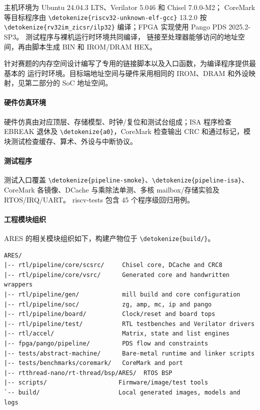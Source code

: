\documentclass[UTF8,a4paper,12pt,fontset=none,scheme=plain]{ctexart}
\newcommand{\code}[1]{\texttt{\detokenize{#1}}}
\renewcommand{\code}[1]{{\small\ttfamily\urlstyle{tt}\expandafter\nolinkurl\expandafter{\detokenize{#1}}}}
\begin{document}
主机环境为 Ubuntu 24.04.3 LTS、Verilator 5.046 和 Chisel 7.0.0-M2；
CoreMark 等目标程序由 \code{riscv32-unknown-elf-gcc} 13.2.0 按
\code{rv32im_zicsr/ilp32} 编译；FPGA 实现使用 Pango PDS 2025.2-SP3。
测试程序与裸机运行时环境共同编译，
链接至处理器能够访问的地址空间，再由脚本生成 BIN 和 IROM/DRAM HEX。

针对赛题的内存空间设计编写了专用的链接脚本以及入口函数，为编译程序提供最基本的
运行时环境。目标端地址空间与硬件采用相同的 IROM、DRAM 和外设映射，见第二部分的 SoC 地址空间。

\paragraph{硬件仿真环境}

硬件仿真由对应顶层、存储模型、时钟/复位和测试台组成；ISA 程序检查 EBREAK 退休及 \code{a0}，CoreMark 检查输出 CRC 和通过标记，模块测试检查缓存、算术、外设与中断协议。

\paragraph{测试程序}

测试入口覆盖 \code{pipeline-smoke}、\code{pipeline-isa}、CoreMark 各镜像、DCache 与乘除法单测、多核 mailbox/存储实验及 RTOS/IRQ/UART。
riscv-tests 包含 45 个程序级回归用例。

\paragraph{工程模块组织}
ARES 的相关模块组织如下，构建产物位于 \code{build/}。
\begin{lstlisting}[language={},numbers=none]
ARES/
|-- rtl/pipeline/core/scsrc/     Chisel core, DCache and CRC8
|-- rtl/pipeline/core/vsrc/      Generated core and handwritten wrappers
|-- rtl/pipeline/gen/            mill build and core configuration
|-- rtl/pipeline/soc/            zg, amp, mc, ip and pango
|-- rtl/pipeline/board/          Clock/reset and board tops
|-- rtl/pipeline/test/           RTL testbenches and Verilator drivers
|-- rtl/accel/                   Matrix, state and list engines
|-- fpga/pango/pipeline/         PDS flow and constraints
|-- tests/abstract-machine/      Bare-metal runtime and linker scripts
|-- tests/benchmarks/coremark/   CoreMark and port
|-- rtthread-nano/rt-thread/bsp/ARES/  RTOS BSP
|-- scripts/                    Firmware/image/test tools
`-- build/                      Local generated images, models and logs
\end{lstlisting}
\end{document}
